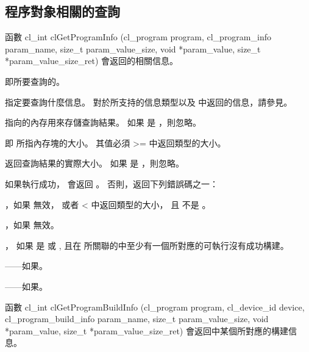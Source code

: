\subsection{程序對象相關的查詢}

函數
\startclc
cl_int clGetProgramInfo (cl_program program,
			cl_program_info param_name,
			size_t param_value_size,
			void *param_value,
			size_t *param_value_size_ret)
\stopclc
會返回的相關信息。

 即所要查詢的。

 指定要查詢什麼信息。
對於所支持的信息類型以及  中返回的信息，請參見。

 指向的內存用來存儲查詢結果。
如果  是 ，則忽略。

 即  所指內存塊的大小。
其值必須 >= 中返回類型的大小。

 返回查詢結果的實際大小。
如果  是 ，則忽略。


如果執行成功， 會返回 。
否則，返回下列錯誤碼之一：
\startigBase
\item {}，如果  無效，
或者  < 中返回類型的大小，
且  不是 。

\item {}，如果  無效。

\item {}，
如果  是  或 ,
且在  所關聯的中至少有一個所對應的可執行沒有成功構建。

\item {}——如果\scdevfailres。

\item {}——如果\schostfailres。
\stopigBase

函數
\startclc
cl_int clGetProgramBuildInfo (cl_program program,
			cl_device_id device,
			cl_program_build_info param_name,
			size_t param_value_size,
			void *param_value,
			size_t *param_value_size_ret)
\stopclc
會返回中某個所對應的構建信息。

